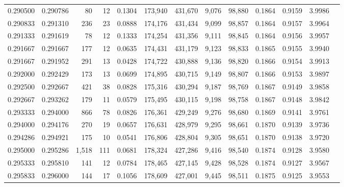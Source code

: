 \begin{tabular}{rrrrrrrrrrrrr}
0.290500 & 0.290786 &    80 &  12 &                                     0.1304 & 173,940 & 431,670 &   9,076 &  98,880 & 0.1864 & 0.9159 & 3.9986 \\
0.290833 & 0.291310 &   236 &  23 &                                     0.0888 & 174,176 & 431,434 &   9,099 &  98,857 & 0.1864 & 0.9157 & 3.9964 \\
0.291333 & 0.291619 &    78 &  12 &                                     0.1333 & 174,254 & 431,356 &   9,111 &  98,845 & 0.1864 & 0.9156 & 3.9957 \\
0.291667 & 0.291667 &   177 &  12 &                                     0.0635 & 174,431 & 431,179 &   9,123 &  98,833 & 0.1865 & 0.9155 & 3.9940 \\
0.291667 & 0.291952 &   291 &  13 &                                     0.0428 & 174,722 & 430,888 &   9,136 &  98,820 & 0.1866 & 0.9154 & 3.9913 \\
0.292000 & 0.292429 &   173 &  13 &                                     0.0699 & 174,895 & 430,715 &   9,149 &  98,807 & 0.1866 & 0.9153 & 3.9897 \\
0.292500 & 0.292667 &   421 &  38 &                                     0.0828 & 175,316 & 430,294 &   9,187 &  98,769 & 0.1867 & 0.9149 & 3.9858 \\
0.292667 & 0.293262 &   179 &  11 &                                     0.0579 & 175,495 & 430,115 &   9,198 &  98,758 & 0.1867 & 0.9148 & 3.9842 \\
0.293333 & 0.294000 &   866 &  78 &                                     0.0826 & 176,361 & 429,249 &   9,276 &  98,680 & 0.1869 & 0.9141 & 3.9761 \\
0.294000 & 0.294176 &   270 &  19 &                                     0.0657 & 176,631 & 428,979 &   9,295 &  98,661 & 0.1870 & 0.9139 & 3.9736 \\
0.294286 & 0.294921 &   175 &  10 &                                     0.0541 & 176,806 & 428,804 &   9,305 &  98,651 & 0.1870 & 0.9138 & 3.9720 \\
0.295000 & 0.295286 & 1,518 & 111 &                                     0.0681 & 178,324 & 427,286 &   9,416 &  98,540 & 0.1874 & 0.9128 & 3.9580 \\
0.295333 & 0.295810 &   141 &  12 &                                     0.0784 & 178,465 & 427,145 &   9,428 &  98,528 & 0.1874 & 0.9127 & 3.9567 \\
0.295833 & 0.296000 &   144 &  17 &                                     0.1056 & 178,609 & 427,001 &   9,445 &  98,511 & 0.1875 & 0.9125 & 3.9553 \\

\end{tabular}
